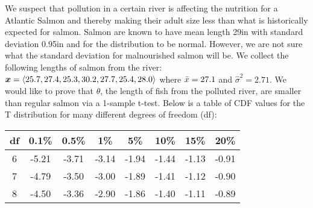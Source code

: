 \documentclass[12pt,landscape]{article}
\begin{document}
\problem{} We suspect that pollution in a certain river is affecting the nutrition for a Atlantic Salmon and thereby making their adult size less than what is historically expected for salmon. Salmon are known to have mean length 29in with standard deviation 0.95in and for the distribution to be normal. However, we are not sure what the standard deviation for malnourished salmon will be. We collect the following lengths of salmon from the river: $\boldsymbol{x} = \left<25.7, 27.4, 25.3, 30.2, 27.7, 25.4, 28.0\right>$ where $\bar{x} = 27.1$ and $\hat{\sigma}^2 = 2.71$. We would like to prove that $\theta$, the length of fish from the polluted river, are smaller than regular salmon via a 1-sample t-test. Below is a table of CDF values for the T distribution for many different degrees of freedom (df):

\begin{table}[h]
\centering
\begin{tabular}{c|ccccccc} %
df & 0.1\% & 0.5\% & 1\% & 5\% & 10\% & 15\% & 20\% \\ \hline
6 & -5.21 & -3.71 & -3.14 &-1.94 &-1.44 &-1.13 &-0.91 \\
7 & -4.79 & -3.50 &-3.00 &-1.89 &-1.41 &-1.12 &-0.90 \\
8 & -4.50 & -3.36 &-2.90 &-1.86 &-1.40 &-1.11 &-0.89 \\
\end{tabular}
\end{table}


\vspace{-0.2cm}\benum{} 
\end{document}
